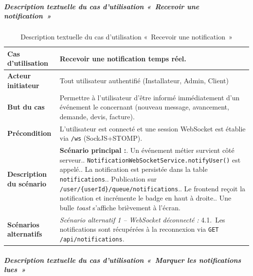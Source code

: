 \subparagraph{Description textuelle du cas d'utilisation «~Recevoir une notification~»}

\begin{table}[H]
  \caption{Description textuelle du cas d'utilisation «~Recevoir une notification~»}
  \label{tab:cu-recevoir-notif}
  \centering
  \begin{tabularx}{\textwidth}{|L{3.8cm}|X|}
    \hline
    \textbf{Cas d'utilisation} & Recevoir une notification temps réel. \\
    \hline
    \textbf{Acteur initiateur} & Tout utilisateur authentifié (Installateur, Admin, Client) \\
    \hline
    \textbf{But du cas} & Permettre à l'utilisateur d'être informé immédiatement d'un événement le concernant (nouveau message, avancement, demande, devis, facture). \\
    \hline
    \textbf{Précondition} & L'utilisateur est connecté et une session WebSocket est établie via \texttt{/ws} (SockJS+STOMP). \\
    \hline
    \textbf{Description du scénario} &
    \textbf{Scénario principal :}. Un événement métier survient côté serveur.. \texttt{NotificationWebSocketService.notifyUser()} est appelé.. La notification est persistée dans la table \texttt{notifications}.. Publication sur \texttt{/user/\{userId\}/queue/notifications}.. Le frontend reçoit la notification et incrémente le badge en haut à droite.. Une bulle \textit{toast} s'affiche brièvement à l'écran.\\
    \hline
    \textbf{Scénarios alternatifs} &
    \textit{Scénario alternatif 1 -- WebSocket déconnecté :}\newline
    \hspace*{6pt}4.1.~Les notifications sont récupérées à la reconnexion via \texttt{GET /api/notifications}.\\
    \hline
  \end{tabularx}
\end{table}

\subparagraph{Description textuelle du cas d'utilisation «~Marquer les notifications lues~»}

